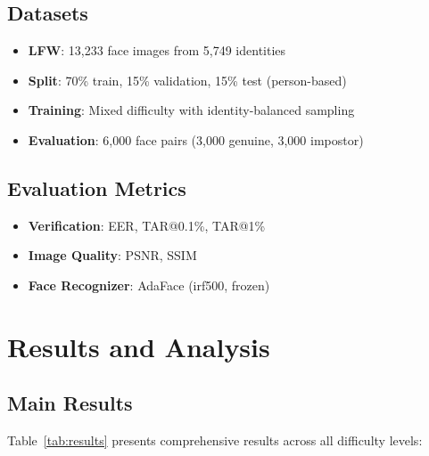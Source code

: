 \documentclass[12pt,a4paper]{article}
\begin{document}
\subsection{Datasets}

\begin{itemize}
    \item \textbf{LFW}: 13,233 face images from 5,749 identities
    \item \textbf{Split}: 70\% train, 15\% validation, 15\% test (person-based)
    \item \textbf{Training}: Mixed difficulty with identity-balanced sampling
    \item \textbf{Evaluation}: 6,000 face pairs (3,000 genuine, 3,000 impostor)
\end{itemize}

\subsection{Evaluation Metrics}

\begin{itemize}
    \item \textbf{Verification}: EER, TAR@0.1\%, TAR@1\%
    \item \textbf{Image Quality}: PSNR, SSIM
    \item \textbf{Face Recognizer}: AdaFace (irf500, frozen)
\end{itemize}

\section{Results and Analysis}

\subsection{Main Results}

Table~\ref{tab:results} presents comprehensive results across all difficulty levels:
\end{document}
